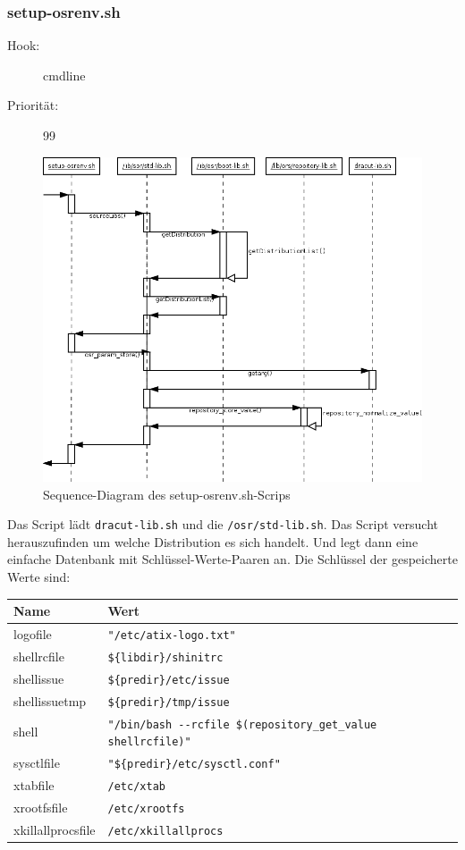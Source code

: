 \documentclass[10pt,a4paper]{article}
\begin{document}
\subsubsection{setup-osrenv.sh}
\begin{description}
\item[Hook:] cmdline
\item[Priorität:] 99
\end{description}

\begin{figure}[H]
 \centering
 \includegraphics[scale=0.35]{./sequence_diagram_setup-osrenv_DE_de.png}
 \caption[]{Sequence-Diagram des setup-osrenv.sh-Scrips}
\end{figure}

Das Script lädt \texttt{dracut-lib.sh} und die \texttt{/osr/std-lib.sh}. Das Script versucht herauszufinden um welche Distribution es sich handelt. Und legt dann eine einfache Datenbank  mit Schlüssel-Werte-Paaren an. Die Schlüssel der gespeicherte Werte sind:
\medskip 

\begin{tabular}{|l|l|}
 \hline
\textbf{Name} & \textbf{ Wert} \\ \hline
logofile          & \verb|"/etc/atix-logo.txt"|  \\ \hline
shellrcfile       & \verb|${libdir}/shinitrc|  \\ \hline
shellissue        & \verb|${predir}/etc/issue|  \\ \hline
shellissuetmp     & \verb|${predir}/tmp/issue|  \\ \hline
shell             & \verb|"/bin/bash --rcfile $(repository_get_value shellrcfile)"|  \\ \hline
sysctlfile        & \verb|"${predir}/etc/sysctl.conf"|  \\ \hline
xtabfile          & \verb|/etc/xtab|  \\ \hline
xrootfsfile       & \verb|/etc/xrootfs|  \\ \hline
xkillallprocsfile & \verb|/etc/xkillallprocs|  \\ \hline
\end{tabular} 
\end{document}
